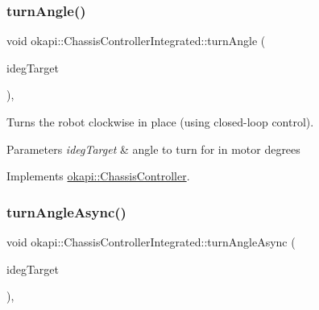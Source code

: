 \subsubsection{\texorpdfstring{turnAngle()}{turnAngle()}\hspace{0.1cm}{\footnotesize\ttfamily [2/2]}}
{\footnotesize\ttfamily void okapi\+::\+Chassis\+Controller\+Integrated\+::turn\+Angle (\begin{DoxyParamCaption}\item[{double}]{ideg\+Target }\end{DoxyParamCaption})\hspace{0.3cm}{\ttfamily [override]}, {\ttfamily [virtual]}}

Turns the robot clockwise in place (using closed-\/loop control).


\begin{DoxyCode}{0}
\DoxyCodeLine{\textcolor{comment}{// Turn clockwise by spinning the motors 200 degrees}}
\end{DoxyCode}



\begin{DoxyParams}{Parameters}
{\em ideg\+Target} & angle to turn for in motor degrees \\
\hline
\end{DoxyParams}


Implements \mbox{\hyperlink{classokapi_1_1ChassisController_a6aca227e35ececd02eed1cc42d09ad1d}{okapi\+::\+Chassis\+Controller}}.

\mbox{\label{classokapi_1_1ChassisControllerIntegrated_a773a99fe7a1540da856ad6b6008ba24f}} 
\subsubsection{\texorpdfstring{turnAngleAsync()}{turnAngleAsync()}\hspace{0.1cm}{\footnotesize\ttfamily [1/2]}}
{\footnotesize\ttfamily void okapi\+::\+Chassis\+Controller\+Integrated\+::turn\+Angle\+Async (\begin{DoxyParamCaption}\item[{Q\+Angle}]{ideg\+Target }\end{DoxyParamCaption})\hspace{0.3cm}{\ttfamily [override]}, {\ttfamily [virtual]}}

